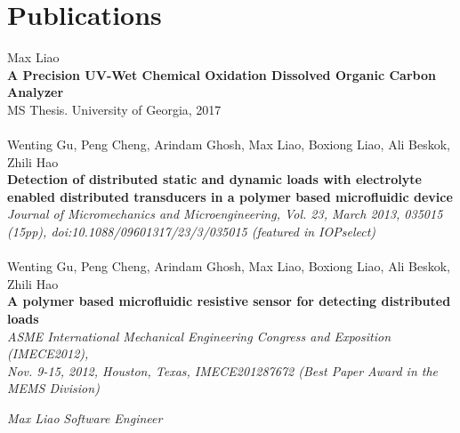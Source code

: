 \documentclass[]{resume}
\begin{document}
			\section{Publications}
			Max Liao\\ \textbf{A Precision UV-Wet Chemical Oxidation Dissolved Organic Carbon Analyzer}\\
			MS Thesis. University of Georgia, 2017
			\\\\
			Wenting Gu, Peng Cheng, Arindam Ghosh, Max Liao, Boxiong Liao, Ali Beskok, Zhili Hao\\
			\textbf{Detection of distributed static and dynamic loads with electrolyte enabled distributed transducers in a polymer based microfluidic device}\\
			\emph{ Journal of Micromechanics and Microengineering, Vol. 23, March 2013, 035015 (15pp), doi:10.1088/09601317/23/3/035015 (featured in IOPselect) }
			\\\\
			Wenting Gu, Peng Cheng, Arindam Ghosh, Max Liao, Boxiong Liao, Ali Beskok, Zhili Hao\\
			\textbf{A polymer based microfluidic resistive sensor for detecting distributed loads}\\
			\emph{ ASME International Mechanical Engineering Congress and Exposition (IMECE2012), \\ Nov. 9-15, 2012, Houston, Texas, IMECE201287672 (Best Paper Award in the MEMS Division) }
			\\
			\begin{flushleft}
			\end{flushleft}
			\begin{flushright}
				\emph{Max Liao }
				\emph{ Software Engineer}
			\end{flushright}
\end{document}
